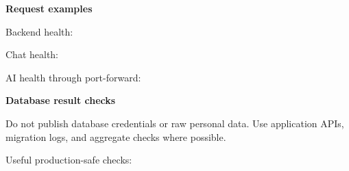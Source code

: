 \vspace{0.5em}\noindent\textbf{Request examples}\par

Backend health:

\begin{Shaded}
\begin{Highlighting}[]
 
\end{Highlighting}
\end{Shaded}

Chat health:

\begin{Shaded}
\begin{Highlighting}[]
 
\end{Highlighting}
\end{Shaded}

AI health through port-forward:

\begin{Shaded}
\begin{Highlighting}[]
 
\end{Highlighting}
\end{Shaded}

\vspace{0.5em}\noindent\textbf{Database result checks}\par

Do not publish database credentials or raw personal data. Use
application APIs, migration logs, and aggregate checks where possible.

Useful production-safe checks:

\begin{Shaded}
\begin{Highlighting}[]
\OperatorTok{=}
\OperatorTok{=}
\OperatorTok{=}
\end{Highlighting}
\end{Shaded}

